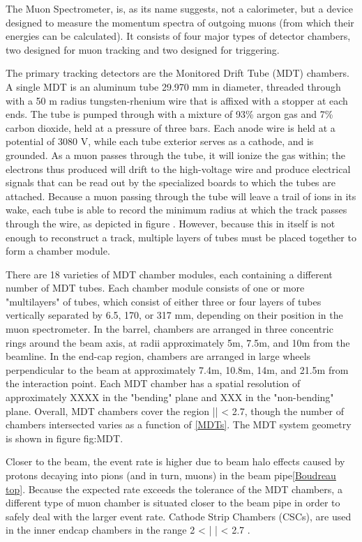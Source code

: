 The Muon Spectrometer, is, as its name suggests, not a calorimeter, but a device designed to measure the momentum spectra of outgoing muons (from which their energies can be calculated). It consists of four major types of detector chambers, two designed for muon tracking and two designed for triggering. 

The primary tracking detectors are the Monitored Drift Tube (MDT) chambers. A single MDT is an aluminum tube 29.970 mm in diameter, threaded through with a 50 \mu m radius tungsten-rhenium wire that is affixed with a stopper at each ends. The tube is pumped through with a mixture of 93\% argon gas and 7\% carbon dioxide, held at a pressure of three bars. Each anode wire is held at a potential of 3080 V, while each tube exterior serves as a cathode, and is grounded. As a muon passes through the tube, it will ionize the gas within; the electrons thus produced will drift to the high-voltage wire and produce electrical signals that can be read out by the specialized boards to which the tubes are attached. Because a muon passing through the tube will leave a trail of ions in its wake, each tube is able to record the minimum radius at which the track passes through the wire, as depicted in figure . However, because this in itself is not enough to reconstruct a track, multiple layers of tubes must be placed together to form a chamber module.

There are 18 varieties of MDT chamber modules, each containing a different number of MDT tubes. Each chamber module consists of one or more "multilayers" of tubes, which consist of either three or four layers of tubes vertically separated by 6.5, 170, or 317 mm, depending on their position in the muon spectrometer. In the barrel, chambers are arranged in three concentric rings around the beam axis, at radii approximately 5m, 7.5m, and 10m from the beamline. In the end-cap region, chambers are arranged in large wheels perpendicular to the beam at approximately 7.4m, 10.8m, 14m, and 21.5m from the interaction point. Each MDT chamber has a spatial resolution of approximately XXXX in the "bending" \eta plane and XXX in the "non-bending" \phi plane. Overall, MDT chambers cover the region |\eta | < 2.7, though the number of chambers intersected varies as a function of \eta \ref{MDTs}. The MDT system geometry is shown in figure {fig:MDT}. 

Closer to the beam, the event rate is higher due to beam halo effects caused by protons decaying into pions (and in turn, muons) in the beam pipe\ref{Boudreau top}. Because the expected rate exceeds the tolerance of the MDT chambers, a different type of muon chamber is situated closer to the beam pipe in order to safely deal with the larger event rate. Cathode Strip Chambers (CSCs), are used in the inner endcap chambers in the range 2 < | \eta | < 2.7 .

